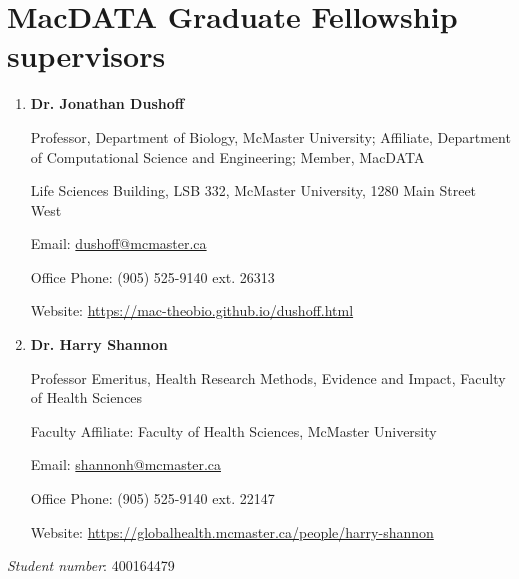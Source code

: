\documentclass[12pt]{article}
\begin{document}
\section*{MacDATA Graduate Fellowship supervisors}

\begin{enumerate}

\item \textbf{Dr. Jonathan Dushoff}

Professor, Department of Biology, McMaster University; Affiliate,  Department of Computational Science and Engineering; Member, MacDATA

Life Sciences Building, LSB 332, McMaster University, 1280 Main Street West

Email: \url{dushoff@mcmaster.ca}

Office Phone: (905) 525-9140 ext. 26313

Website: \url{https://mac-theobio.github.io/dushoff.html}

\item \textbf{Dr. Harry Shannon}

Professor Emeritus, Health Research Methods, Evidence and Impact, Faculty of Health Sciences

Faculty Affiliate: Faculty of Health Sciences, McMaster University

Email: \url{shannonh@mcmaster.ca}

Office Phone: (905) 525-9140 ext. 22147

Website: \url{https://globalhealth.mcmaster.ca/people/harry-shannon}

\end{enumerate}

\emph{Student number}: 400164479
\end{document}
